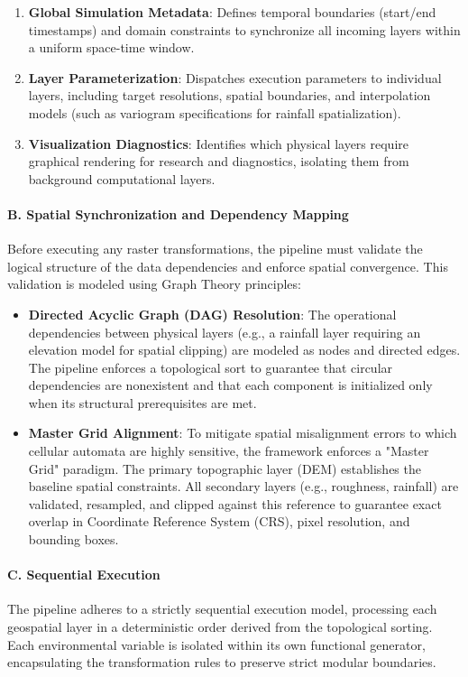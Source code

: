 \begin{enumerate}
    \item \textbf{Global Simulation Metadata}: Defines temporal boundaries (start/end timestamps) and domain constraints to synchronize 
    all incoming layers within a uniform space-time window.

    \item \textbf{Layer Parameterization}: Dispatches execution parameters to individual layers, including target resolutions, spatial 
    boundaries, and interpolation models (such as variogram specifications for rainfall spatialization).

    \item \textbf{Visualization Diagnostics}: Identifies which physical layers require graphical rendering for research and diagnostics, 
    isolating them from background computational layers.
\end{enumerate}

\paragraph{B. Spatial Synchronization and Dependency Mapping}

Before executing any raster transformations, the pipeline must validate the logical structure of the data dependencies and enforce spatial 
convergence. This validation is modeled using Graph Theory principles:

\begin{itemize}
    \item \textbf{Directed Acyclic Graph (DAG) Resolution}: The operational dependencies between physical layers (e.g., a rainfall layer 
    requiring an elevation model for spatial clipping) are modeled as nodes and directed edges. The pipeline enforces a topological sort 
    to guarantee that circular dependencies are nonexistent and that each component is initialized only when its structural prerequisites 
    are met.

    \item \textbf{Master Grid Alignment}: To mitigate spatial misalignment errors to which cellular automata are highly sensitive, the 
    framework enforces a "Master Grid" paradigm. The primary topographic layer (DEM) establishes the baseline spatial constraints. All 
    secondary layers (e.g., roughness, rainfall) are validated, resampled, and clipped against this reference to guarantee exact overlap 
    in Coordinate Reference System (CRS), pixel resolution, and bounding boxes.
\end{itemize}

\paragraph{C. Sequential Execution}

The pipeline adheres to a strictly sequential execution model, processing each geospatial layer in a deterministic order derived from the 
topological sorting. Each environmental variable is isolated within its own functional generator, encapsulating the transformation rules
to preserve strict modular boundaries.
